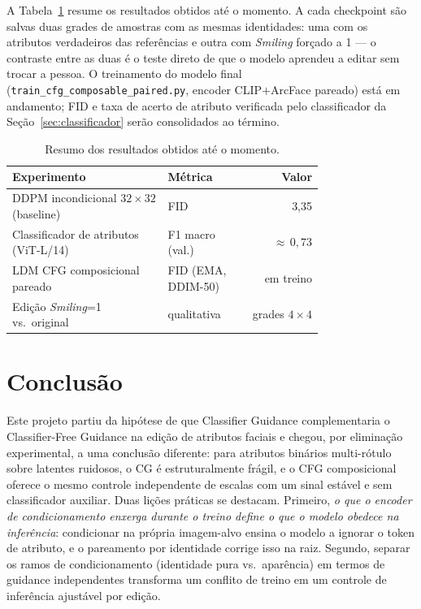 \documentclass[10pt,twocolumn]{article}
\begin{document}
A Tabela~\ref{tab:resultados} resume os resultados obtidos até o momento.
A cada checkpoint são salvas duas grades de amostras com as mesmas
identidades: uma com os atributos verdadeiros das referências e outra com
\emph{Smiling} forçado a 1 --- o contraste entre as duas é o teste direto
de que o modelo aprendeu a editar sem trocar a pessoa. O treinamento do
modelo final (\texttt{train\_cfg\_composable\_paired.py}, encoder
CLIP$+$ArcFace pareado) está em andamento; FID e taxa de acerto de
atributo verificada pelo classificador da Seção~\ref{sec:classificador}
serão consolidados ao término.

\begin{table}[t]
  \centering
  \caption{Resumo dos resultados obtidos até o momento.}
  \label{tab:resultados}
  \small
  \begin{tabular}{@{}p{0.5\linewidth}p{0.26\linewidth}r@{}}
    \toprule
    \textbf{Experimento} & \textbf{Métrica} & \textbf{Valor} \\
    \midrule
    DDPM incondicional $32{\times}32$ (baseline)      & FID                    & 3,35 \\
    Classificador de atributos (ViT-L/14)             & F1 macro (val.)        & ${\approx}\,0{,}73$ \\
    LDM CFG composicional pareado                     & FID (EMA, DDIM-50)     & em treino \\
    Edição \emph{Smiling}=1 vs.\ original             & qualitativa            & grades $4{\times}4$ \\
    \bottomrule
  \end{tabular}
\end{table}

\section{Conclusão}

Este projeto partiu da hipótese de que Classifier Guidance complementaria
o Classifier-Free Guidance na edição de atributos faciais e chegou, por
eliminação experimental, a uma conclusão diferente: para atributos
binários multi-rótulo sobre latentes ruidosos, o CG é estruturalmente
frágil, e o CFG composicional oferece o mesmo controle independente de
escalas com um sinal estável e sem classificador auxiliar. Duas lições
práticas se destacam. Primeiro, \emph{o que o encoder de condicionamento
enxerga durante o treino define o que o modelo obedece na inferência}:
condicionar na própria imagem-alvo ensina o modelo a ignorar o token de
atributo, e o pareamento por identidade corrige isso na raiz. Segundo,
separar os ramos de condicionamento (identidade pura vs.\ aparência) em
termos de guidance independentes transforma um conflito de treino em um
controle de inferência ajustável por edição.
\end{document}
